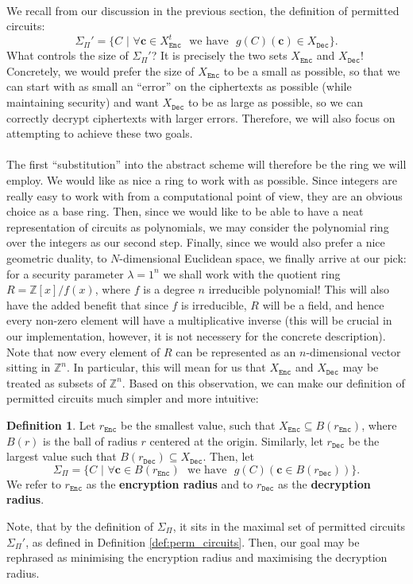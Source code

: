 \documentclass{article}
\theoremstyle{definition}
\newtheorem{definition}{Definition}[section]
\theoremstyle{example}
\newcommand{\Enc}{\texttt{Enc}}
\newcommand{\Dec}{\texttt{Dec}}
\newcommand{\Int}{\mathbb{Z}}
\renewcommand{\vec}[1]{\mathbf{#1}}
\begin{document}
\paragraph{} We recall from our discussion in the previous section, the
definition of permitted circuits:
\[
  \Sigma_\Pi' = \{C\,\,|\,\, \forall \vec{c} \in X_\Enc^t\,\,\text{ we
    have }\,\,g(C)(\vec{c}) \in X_\Dec\}.
\]
What controls the size of $\Sigma_\Pi'$? It is precisely the two sets $X_\Enc$
and $X_\Dec$! Concretely, we would prefer the size of $X_\Enc$ to be a small as
possible, so that we can start with as small an ``error'' on the ciphertexts as
possible (while maintaining security) and want $X_\Dec$ to be as large as
possible, so we can correctly decrypt ciphertexts with larger errors. Therefore,
we will also focus on attempting to achieve these two goals.
\paragraph{} The first ``substitution'' into the abstract scheme will therefore
be the ring we will employ. We would like as nice a ring to work with as
possible. Since integers are really easy to work with from a computational
point of view, they are an obvious choice as a base ring. Then, since we would
like to be able to have a neat representation of circuits as polynomials, we may
consider the polynomial ring over the integers as our second step. Finally,
since we would also prefer a nice geometric duality, to $N$-dimensional
Euclidean space, we finally arrive at our pick: for a security parameter
$\lambda = 1^n$ we shall work with the quotient ring $R = \Int[x]/f(x)$, where
$f$ is a degree $n$ irreducible polynomial! This will also have the added
benefit that since $f$ is irreducible, $R$ will be a field, and hence every
non-zero element will have a multiplicative inverse (this will be crucial in our
implementation, however, it is not necessery for the concrete description). Note
that now every element of $R$ can be represented as an $n$-dimensional vector
sitting in $\Int^n$. In particular, this will mean for us that $X_\Enc$ and
$X_\Dec$ may be treated as subsets of $\Int^n$. Based on this observation, we
can make our definition of permitted circuits much simpler and more intuitive:
\begin{definition}
  Let $r_\Enc$ be the smallest value, such that $X_\Enc \subseteq B(r_\Enc)$,
  where $B(r)$ is the ball of radius $r$ centered at the origin. Similarly, let
  $r_\Dec$ be the largest value such that $B(r_\Dec) \subseteq X_\Dec$. Then, let
  \[
    \Sigma_\Pi = \{C\,\,|\,\,\forall \vec{c} \in B(r_\Enc)\,\,\text{ we have
    }\,\,g(C)(\vec{c} \in B(r_\Dec))\}.
  \]
  We refer to $r_\Enc$ as the \textbf{encryption radius} and to $r_\Dec$ as the
  \textbf{decryption radius}.
\end{definition}
Note, that by the definition of $\Sigma_\Pi$, it sits in the maximal set of
permitted circuits $\Sigma_\Pi'$, as defined in Definition
\ref{def:perm_circuits}. Then, our goal may be rephrased as minimising the
encryption radius and maximising the decryption radius.
\end{document}
